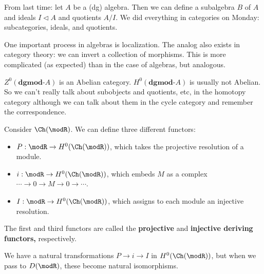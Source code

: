 \documentclass[12pt]{article}
\newcommand*{\dgmodA}{\mathbf{dgmod}\text{-}A}
\begin{document}
\begin{rmk}
	From last time: let $A$ be a (dg) algebra. Then we can define a subalgebra $B$ of $A$
	and ideals $I\lhd A$ and quotients $A/I$. We did everything in categories on Monday: subcategories, ideals, and quotients.

	One important process in algebras is localization. The analog also exists in category theory: we can invert 
	a collection of morphisms. This is more complicated (as expected) than in the case of algebras, but analogous.
\end{rmk}
\begin{rmk}
	$Z^0(\dgmodA)$ is an Abelian category. $H^0(\dgmodA)$ is usually not Abelian. So we can't really
	talk about subobjects and quotients, etc, in the homotopy category although we can talk about them in the 
	cycle category and remember the correspondence.
\end{rmk}
\begin{rmk}
	Consider $\Ch(\modR)$. We can define three different functors:
	\begin{itemize}
		\item $P:\modR\to H^0(\Ch(\modR))$, which takes the projective resolution of a module.
		\item $i:\modR\to H^0(\Ch(\modR))$, which embeds $M$ as a complex $\cdots\to 0\to M\to 0\to \cdots$.
		\item $I:\modR\to H^0(\Ch(\modR))$, which assigns to each module an injective resolution.
	\end{itemize}
	The first and third functors are called the \textbf{projective} and \textbf{injective deriving functors,} respectively.

	We have a natural transformations $P\to i\to I$ in $H^0(\Ch(\modR))$, but when we pass to $D(\modR)$,
	these become natural isomorphisms.
\end{rmk}
\end{document}
